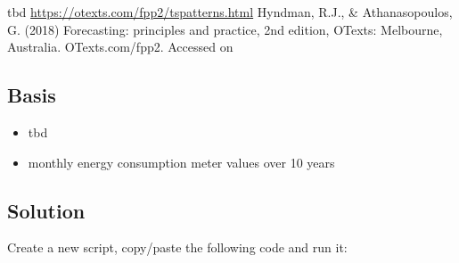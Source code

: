 \documentclass[
]{book}
\providecommand{\tightlist}{%
  \setlength{\itemsep}{0pt}\setlength{\parskip}{0pt}}
\begin{document}
tbd
\url{https://otexts.com/fpp2/tspatterns.html}
Hyndman, R.J., \& Athanasopoulos, G. (2018) Forecasting: principles and practice, 2nd edition, OTexts: Melbourne, Australia. OTexts.com/fpp2. Accessed on

\hypertarget{basis}{%
\subsection{Basis}\label{basis}}

\begin{itemize}
\tightlist
\item
  tbd
\item
  monthly energy consumption meter values over 10 years
\end{itemize}

\hypertarget{solution-4}{%
\subsection{Solution}\label{solution-4}}

Create a new script, copy/paste the following code and run it:
\end{document}
